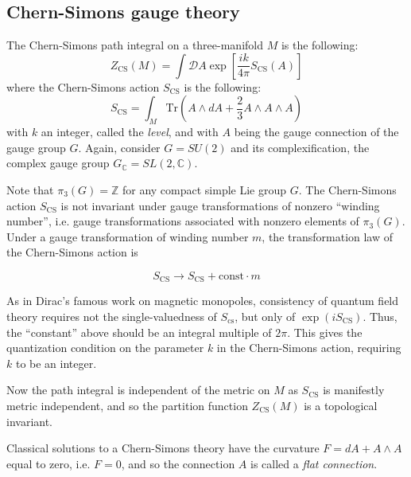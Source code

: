 \documentclass[a4paper,titlepage,twoside]{book}
\begin{document}
\subsection{Chern-Simons gauge theory }

The Chern-Simons path integral on a three-manifold $M$ is the following:
\begin{equation}
Z_{\text{CS}}{ (M) } = \int \mathcal{D}A \exp{ \left[ \frac{i k }{ 4\pi } S_{\text{CS}}{ (A)}  \right] }
\end{equation}
where the Chern-Simons action $S_{\text{CS}}$ is the following:
\begin{equation}
S_{\text{CS}} = \int_M \text{Tr}{ \left( A \wedge dA + \frac{2}{3} A \wedge A \wedge A \right) }  \label{eq:CSaction00}
\end{equation}
with $k$ an integer, called the \emph{level}, and with $A$ being the gauge connection of the gauge group $G$.  Again, consider $G=SU(2)$ and its complexification, the complex gauge group $G_{\mathbb{C}} = SL{(2,\mathbb{C})}$.

Note that $\pi_3(G) = \mathbb{Z}$ for any compact simple Lie group $G$.  The Chern-Simons action $S_{\text{CS}}$ is not invariant under gauge transformations of nonzero ``winding number'', i.e. gauge transformations associated with nonzero elements of $\pi_3(G)$.  Under a gauge transformation of winding number $m$, the transformation law of the Chern-Simons action is 

\begin{equation}
  S_{\text{CS}} \to S_{\text{CS}} + \text{const} \cdot m 
\end{equation}

As in Dirac's famous work on magnetic monopoles, consistency of quantum field theory requires not the single-valuedness of $S_{\text{cs}}$, but only of $\exp{ ( i S_{\text{CS}}) }$.  Thus, the ``constant'' above should be an integral multiple of $2\pi$.  This gives the quantization condition on the parameter $k$ in the Chern-Simons action, requiring $k$ to be an integer.  

Now the path integral is independent of the metric on $M$ as $S_{\text{CS}}$ is manifestly metric independent, and so the partition function $Z_{\text{CS}}{ (M)}$ is a topological invariant.  

Classical solutions to a Chern-Simons theory have the curvature $F = dA + A \wedge A$ equal to zero, i.e. $F=0$, and so the connection $A$ is called a \emph{flat connection}.  
\end{document}
